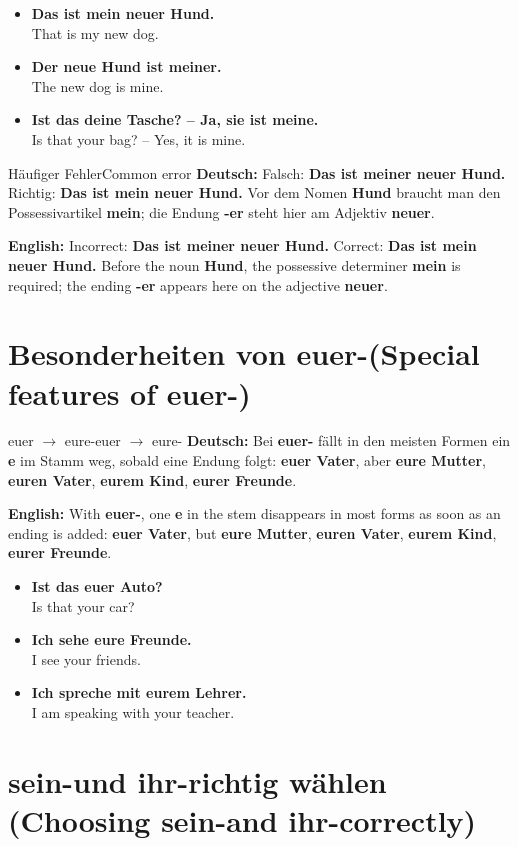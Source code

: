 \documentclass[a4paper,11pt]{article}
\newcommand{\GermanText}[1]{\textbf{Deutsch: }#1\par}
\newcommand{\EnglishText}[1]{{\small\color{SoftGray}\textbf{English: }#1\par}}
\newcommand{\ExampleItem}[2]{\item \textbf{#1}\\{\small\color{SoftGray}#2}}
\begin{document}
\begin{exbox}
\begin{itemize}
\ExampleItem{Das ist mein neuer Hund.}{That is my new dog.}
\ExampleItem{Der neue Hund ist meiner.}{The new dog is mine.}
\ExampleItem{Ist das deine Tasche? -- Ja, sie ist meine.}{Is that your bag? -- Yes, it is mine.}
\end{itemize}
\end{exbox}

\begin{grammarentry}{Häufiger Fehler}{Common error}
\GermanText{Falsch: \textbf{Das ist meiner neuer Hund.} Richtig: \textbf{Das ist mein neuer Hund.} Vor dem Nomen \textbf{Hund} braucht man den Possessivartikel \textbf{mein}; die Endung \textbf{-er} steht hier am Adjektiv \textbf{neuer}.}
\EnglishText{Incorrect: \textbf{Das ist meiner neuer Hund.} Correct: \textbf{Das ist mein neuer Hund.} Before the noun \textbf{Hund}, the possessive determiner \textbf{mein} is required; the ending \textbf{-er} appears here on the adjective \textbf{neuer}.}
\end{grammarentry}

\section{Besonderheiten von \glqq euer-\grqq \textnormal{(Special features of \glqq euer-\grqq)}}

\begin{grammarentry}{euer $\rightarrow$ eure-}{euer $\rightarrow$ eure-}
\GermanText{Bei \textbf{euer-} fällt in den meisten Formen ein \textbf{e} im Stamm weg, sobald eine Endung folgt: \textbf{euer Vater}, aber \textbf{eure Mutter}, \textbf{euren Vater}, \textbf{eurem Kind}, \textbf{eurer Freunde}.}
\EnglishText{With \textbf{euer-}, one \textbf{e} in the stem disappears in most forms as soon as an ending is added: \textbf{euer Vater}, but \textbf{eure Mutter}, \textbf{euren Vater}, \textbf{eurem Kind}, \textbf{eurer Freunde}.}
\end{grammarentry}

\begin{exbox}
\begin{itemize}
\ExampleItem{Ist das euer Auto?}{Is that your car?}
\ExampleItem{Ich sehe eure Freunde.}{I see your friends.}
\ExampleItem{Ich spreche mit eurem Lehrer.}{I am speaking with your teacher.}
\end{itemize}
\end{exbox}

\section{\glqq sein-\grqq und \glqq ihr-\grqq richtig wählen \textnormal{(Choosing \glqq sein-\grqq and \glqq ihr-\grqq correctly)}}
\end{document}
